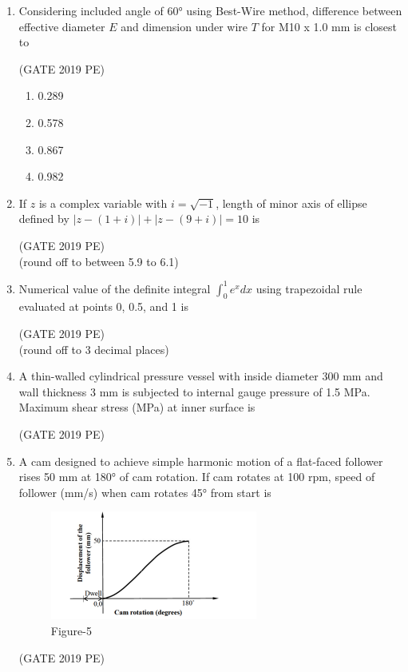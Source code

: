 \documentclass[journal,12pt,onecolumn]{exam}
\theoremstyle{remark}
\begin{document}
\begin{enumerate}
\item Considering included angle of 60° using Best-Wire method, difference between effective diameter \(E\) and dimension under wire \(T\) for M10 x 1.0 mm is closest to

\hfill{(GATE 2019 PE)}\\
\begin{enumerate}
    \item 0.289
    \item 0.578
    \item 0.867
    \item 0.982
\end{enumerate}

\item If \(z\) is a complex variable with \(i = \sqrt{-1}\), length of minor axis of ellipse defined by \(|z-(1+i)| + |z-(9+i)| = 10\) is

\hfill{(GATE 2019 PE)}\\
(round off to between 5.9 to 6.1)

\item Numerical value of the definite integral \(\int_0^1 e^x dx\) using trapezoidal rule evaluated at points 0, 0.5, and 1 is

\hfill{(GATE 2019 PE)}\\
(round off to 3 decimal places)

\item A thin-walled cylindrical pressure vessel with inside diameter 300 mm and wall thickness 3 mm is subjected to internal gauge pressure of 1.5 MPa. Maximum shear stress (MPa) at inner surface is

\hfill{(GATE 2019 PE)}\\

\item A cam designed to achieve simple harmonic motion of a flat-faced follower rises 50 mm at 180° of cam rotation. If cam rotates at 100 rpm, speed of follower (mm/s) when cam rotates 45° from start is
\begin{figure}[H]
    \centering
    \includegraphics[width=0.5\linewidth]{figs/fig5.png}
    \caption{Figure-5}
    \label{fig:figs/fig5.png}
\end{figure}
\hfill{(GATE 2019 PE)}\\


\end{enumerate}
\end{document}
